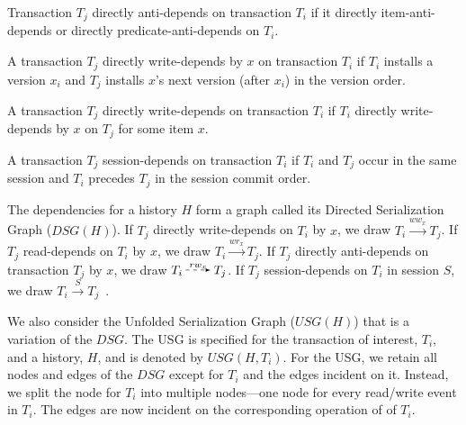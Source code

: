 \begin{definition}
Transaction $T_j$ directly anti-depends on transaction $T_i$ if it
directly item-anti-depends or directly predicate-anti-depends on
$T_i$.
\end{definition}

\begin{definition}
A transaction $T_j$ directly write-depends by $x$ on transaction $T_i$
if $T_i$ installs a version $x_i$ and $T_j$ installs $x$'s next
version (after $x_i$) in the version order.
\end{definition}

\begin{definition}
A transaction $T_j$ directly write-depends on transaction $T_i$ if
$T_i$ directly write-depends by $x$ on $T_j$ for some item $x$.
\end{definition}

\begin{definition}
\label{def:sd1}
A transaction $T_j$ session-depends on transaction $T_i$ if $T_i$ and
$T_j$ occur in the same session and $T_i$ precedes $T_j$ in the
session commit order.
\end{definition}

The dependencies for a history $H$ form a graph called its Directed
Serialization Graph ($DSG(H)$). If $T_j$ directly write-depends on
$T_i$ by $x$, we draw $T_i\overset{ww_x}\longrightarrow T_j$. If $T_j$
read-depends on $T_i$ by $x$, we draw
$T_i \overset{wr_x}\longrightarrow T_j$. If $T_j$ directly
anti-depends on transaction $T_j$ by $x$, we draw
$T_i \overset{rw_x}\DashedArrow T_j$. If $T_j$ session-depends on
$T_i$ in session $S$, we draw $T_i \overset{S}\longrightarrow
T_j$~\cite[Definition 8]{adya}.

We also consider the Unfolded Serialization Graph ($USG(H)$) that is a
variation of the $DSG$. The USG is specified for the transaction of
interest, $T_i$, and a history, $H$, and is denoted by $USG(H,
T_i)$. For the USG, we retain all nodes and edges of the $DSG$ except
for $T_i$ and the edges incident on it. Instead, we split the node for
$T_i$ into multiple nodes---one node for every read/write event in
$T_i$. The edges are now incident on the corresponding operation of of
$T_i$.

